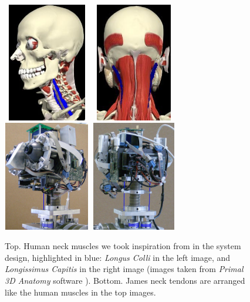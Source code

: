 \documentclass[conference]{IEEEtran}
\numberwithin{equation}{section}
\begin{document}
\begin{figure}[tbp]
\centering
\includegraphics[width=38mm,height=52mm]{image/LongusColliC.jpg} 
\includegraphics[width=38mm,height=52mm]{image/LongissimusCapitisC2.jpg} 
\includegraphics[width=38mm,height=48mm]{image/frontHeadBB.jpg} 
\includegraphics[width=38mm, height=48mm]{image/backHeadBB.jpg} 
\caption{Top. Human neck muscles we took inspiration from in the system design, highlighted in blue: \emph{Longus Colli} in the left image, and \emph{Longissimus Capitis} in the right image (images taken from \emph{Primal 3D Anatomy} software \cite{Kendall05muscles}). Bottom. James neck tendons are arranged like the human muscles in the top images.}
\label{Fig:NeckMuscles}
\end{figure}
\end{document}
